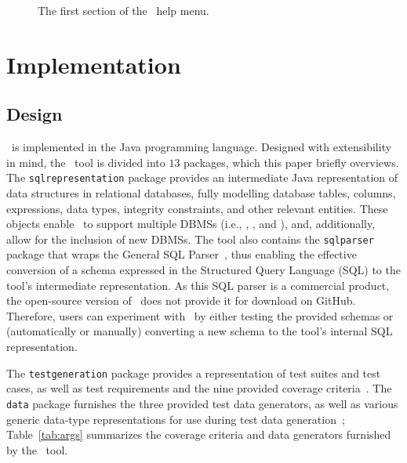 \begin{figure}

\caption{\label{fig:usage} The first section of the \sa~help menu.}
\vspace*{-.1in}
\end{figure}

\section{Implementation}\label{sec:implementation}
\subsection{Design}


\sa~is implemented in the Java programming language.  Designed with extensibility in mind, the \sa~tool is divided into
$13$ packages, which this paper briefly overviews. The \texttt{sqlrepresentation} package provides an intermediate Java
representation of data structures in relational databases, fully modelling database tables, columns, expressions, data
types, integrity constraints, and other relevant entities. These objects enable \sa~to support multiple DBMSs (i.e.,
\sqlite, \postgres, and \hypersql), and, additionally, allow for the inclusion of new DBMSs. The tool also contains the
\texttt{sqlparser} package that wraps the General SQL Parser~\cite{generalsqlparser}, thus enabling the effective
conversion of a schema expressed in the Structured Query Language (SQL) to the tool's intermediate representation. As
this SQL parser is a commercial product, the open-source version of \sa~does not provide it for download on GitHub.
Therefore, users can experiment with \sa~by either testing the provided schemas or (automatically or manually)
converting a new schema to the tool's internal SQL representation.



The \texttt{testgeneration} package provides a representation of test suites and test cases, as well as test
requirements and the nine provided coverage criteria~\cite{mcminn2015effectiveness}.  The \texttt{data} package
furnishes the three provided test data generators, as well as various generic data-type representations for use during
test data generation~\cite{mcminn2015effectiveness}; Table~\ref{tab:args} summarizes the coverage criteria and data
generators furnished by the \sa~tool.

